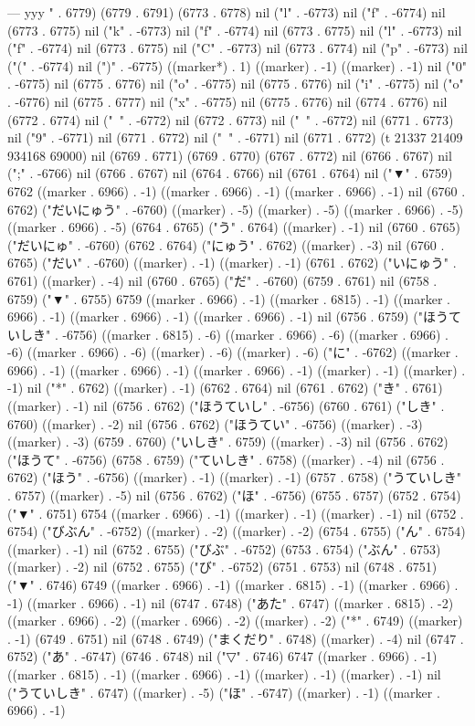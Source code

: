{{---
yyy
" . 6779) (6779 . 6791) (6773 . 6778) nil ("l" . -6773) nil ("f" . -6774) nil (6773 . 6775) nil ("k" . -6773) nil ("f" . -6774) nil (6773 . 6775) nil ("l" . -6773) nil ("f" . -6774) nil (6773 . 6775) nil ("C" . -6773) nil (6773 . 6774) nil ("p" . -6773) nil ("(" . -6774) nil (")" . -6775) ((marker*) . 1) ((marker) . -1) ((marker) . -1) nil ("0" . -6775) nil (6775 . 6776) nil ("o" . -6775) nil (6775 . 6776) nil ("i" . -6775) nil ("o" . -6776) nil (6775 . 6777) nil ("x" . -6775) nil (6775 . 6776) nil (6774 . 6776) nil (6772 . 6774) nil ("~" . -6772) nil (6772 . 6773) nil ("~" . -6772) nil (6771 . 6773) nil ("9" . -6771) nil (6771 . 6772) nil ("~" . -6771) nil (6771 . 6772) (t 21337 21409 934168 69000) nil (6769 . 6771) (6769 . 6770) (6767 . 6772) nil (6766 . 6767) nil (";" . -6766) nil (6766 . 6767) nil (6764 . 6766) nil (6761 . 6764) nil ("▼" . 6759) 6762 ((marker . 6966) . -1) ((marker . 6966) . -1) ((marker . 6966) . -1) nil (6760 . 6762) ("だいにゅう" . -6760) ((marker) . -5) ((marker) . -5) ((marker . 6966) . -5) ((marker . 6966) . -5) (6764 . 6765) ("う" . 6764) ((marker) . -1) nil (6760 . 6765) ("だいにゅ" . -6760) (6762 . 6764) ("にゅう" . 6762) ((marker) . -3) nil (6760 . 6765) ("だい" . -6760) ((marker) . -1) ((marker) . -1) (6761 . 6762) ("いにゅう" . 6761) ((marker) . -4) nil (6760 . 6765) ("だ" . -6760) (6759 . 6761) nil (6758 . 6759) ("▼" . 6755) 6759 ((marker . 6966) . -1) ((marker . 6815) . -1) ((marker . 6966) . -1) ((marker . 6966) . -1) ((marker . 6966) . -1) nil (6756 . 6759) ("ほうていしき" . -6756) ((marker . 6815) . -6) ((marker . 6966) . -6) ((marker . 6966) . -6) ((marker . 6966) . -6) ((marker) . -6) ((marker) . -6) ("に" . -6762) ((marker . 6966) . -1) ((marker . 6966) . -1) ((marker . 6966) . -1) ((marker) . -1) ((marker) . -1) nil ("*" . 6762) ((marker) . -1) (6762 . 6764) nil (6761 . 6762) ("き" . 6761) ((marker) . -1) nil (6756 . 6762) ("ほうていし" . -6756) (6760 . 6761) ("しき" . 6760) ((marker) . -2) nil (6756 . 6762) ("ほうてい" . -6756) ((marker) . -3) ((marker) . -3) (6759 . 6760) ("いしき" . 6759) ((marker) . -3) nil (6756 . 6762) ("ほうて" . -6756) (6758 . 6759) ("ていしき" . 6758) ((marker) . -4) nil (6756 . 6762) ("ほう" . -6756) ((marker) . -1) ((marker) . -1) (6757 . 6758) ("うていしき" . 6757) ((marker) . -5) nil (6756 . 6762) ("ほ" . -6756) (6755 . 6757) (6752 . 6754) ("▼" . 6751) 6754 ((marker . 6966) . -1) ((marker) . -1) ((marker) . -1) nil (6752 . 6754) ("びぶん" . -6752) ((marker) . -2) ((marker) . -2) (6754 . 6755) ("ん" . 6754) ((marker) . -1) nil (6752 . 6755) ("びぶ" . -6752) (6753 . 6754) ("ぶん" . 6753) ((marker) . -2) nil (6752 . 6755) ("び" . -6752) (6751 . 6753) nil (6748 . 6751) ("▼" . 6746) 6749 ((marker . 6966) . -1) ((marker . 6815) . -1) ((marker . 6966) . -1) ((marker . 6966) . -1) nil (6747 . 6748) ("あた" . 6747) ((marker . 6815) . -2) ((marker . 6966) . -2) ((marker . 6966) . -2) ((marker) . -2) ("*" . 6749) ((marker) . -1) (6749 . 6751) nil (6748 . 6749) ("まくだり" . 6748) ((marker) . -4) nil (6747 . 6752) ("あ" . -6747) (6746 . 6748) nil ("▽" . 6746) 6747 ((marker . 6966) . -1) ((marker . 6815) . -1) ((marker . 6966) . -1) ((marker) . -1) ((marker) . -1) nil ("うていしき" . 6747) ((marker) . -5) ("ほ" . -6747) ((marker) . -1) ((marker . 6966) . -1) }}
